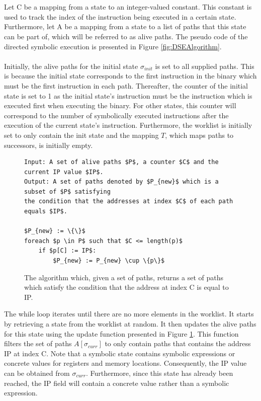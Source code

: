 \documentclass{kththesis}
\begin{document}
\\ \\
Let C be a mapping from a state to an integer-valued constant. This constant is used to track the index of the instruction being executed in a certain state. Furthermore, let A be a mapping from a state to a list of paths that this state can be part of, which will be referred to as alive paths. The pseudo code of the directed symbolic execution is presented in Figure \ref{fig:DSEAlgorithm}.
\\ \\
Initially, the alive paths for the initial state $\sigma_{init}$ is set to all supplied paths. This is because the initial state corresponds to the first instruction in the binary which must be the first instruction in each path. Thereafter, the counter of the initial state is set to 1 as the initial state's instruction must be the instruction which is executed first when executing the binary. For other states, this counter will correspond to the number of symbolically executed instructions after the execution of the current state's instruction. Furthermore, the worklist is initially set to only contain the init state and the mapping $T$, which maps paths to successors, is initially empty.
\clearpage
\begin{figure}[!htbp]
    \centering
\begin{algorithmFrame}
\begin{lstlisting}[style=algorithm]
Input: A set of alive paths $P$, a counter $C$ and the current IP value $IP$. 
Output: A set of paths denoted by $P_{new}$ which is a subset of $P$ satisfying
the condition that the addresses at index $C$ of each path equals $IP$.

$P_{new} := \{\}$
foreach $p \in P$ such that $C <= length(p)$
    if $p[C] := IP$:
        $P_{new} := P_{new} \cup \{p\}$
\end{lstlisting}
\end{algorithmFrame}
\caption[The algorithm which, given a set of paths, returns a set of paths which satisfy the condition that the address at index C is equal to IP.]{The algorithm which, given a set of paths, returns a set of paths which satisfy the condition that the address at index C is equal to IP.}
    \label{fig:DSEupdate}
\end{figure}
\noindent
The while loop iterates until there are no more elements in the worklist. It starts by retrieving a state from the worklist at random. It then updates the alive paths for this state using the update function presented in Figure \ref{fig:DSEupdate}. This function filters the set of paths $A[\sigma_{curr}]$ to only contain paths that contains the address IP at index C. Note that a symbolic state contains symbolic expressions or concrete values for registers and memory locations. Consequently, the IP value can be obtained from $\sigma_{curr}$. Furthermore, since this state has already been reached, the IP field will contain a concrete value rather than a symbolic expression.
\end{document}
